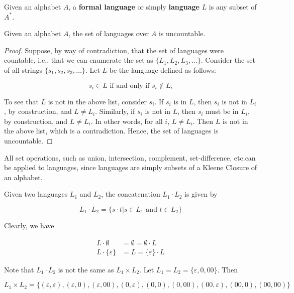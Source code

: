 \begin{definition}
 Given an alphabet \(A\), a \textbf{formal language} or simply \textbf{language} \(L\) is any subset of \(A^*\). 
\end{definition}

\begin{theorem}
 Given an alphabet \(A\), the set of languages over \(A\) is uncountable. 
\end{theorem}

\begin{proof}
 Suppose, by way of contradiction, that the set of languages were countable, i.e., that we can enumerate the set as \( \{L_1, L_2, L_3, \hdots \} \). Consider the set of all strings \( \{s_1, s_2, s_3, \hdots \} \). Let \(L\) be the language defined as follows: 
 
\[s_i\in L\text{ if and only if } s_i\not\in L_i\]

 To see that \(L\) is not in the above list, consider \(s_i\). If \(s_i\) is in \(L\), then \(s_i\) is not in \(L_i\), by construction, and \(L\neq L_i\). Similarly, if \(s_i\) is not in \(L\), then \(s_i\) must be in \(L_i\), by construction, and \(L\neq L_i\). In other words, for all \(i\), \(L\neq L_i\). Then \(L\) is not in the above list, which is a contradiction. Hence, the set of languages is uncountable. 
\end{proof}

All set operations, such as union, intersection, complement, set-difference, etc.\@ can be applied to languages, since languages are simply subsets of a Kleene Closure of an alphabet.

\begin{definition}
 Given two languages \(L_1\) and \(L_2\), the concatenation \(L_1\cdot L_2\) is given by
 
 \[L_1\cdot L_2=\{s\cdot t|s\in L_1\text{ and } t\in L_2\} \]
\end{definition}

Clearly, we have 

\begin{align*}
    L\cdot\emptyset &= \emptyset = \emptyset\cdot L\\
    L\cdot \{\varepsilon \} &= L = \{\varepsilon \}\cdot L
\end{align*}

Note that \(L_1\cdot L_2\) is not the same as \(L_1\times L_2\). Let \(L_1=L_2=\{\varepsilon, 0, 00\} \). Then

\[L_1\times L_2=\{(\varepsilon, \varepsilon), (\varepsilon, 0), (\varepsilon, 00), (0, \varepsilon), (0, 0), (0, 00), (00, \varepsilon), (00, 0), (00, 00)\} \]

